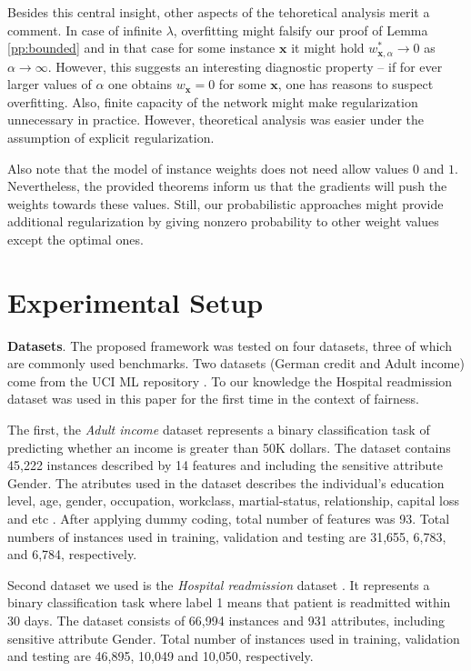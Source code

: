 \documentclass[preprint,12pt]{elsarticle}
\begin{document}
Besides this central insight, other aspects of the tehoretical analysis merit a comment. In case of infinite $\lambda$, overfitting might falsify our proof of Lemma \ref{pp:bounded} and in that case for some instance $\mathbf{x}$ it might hold $w^*_{\mathbf{x},\alpha}\rightarrow 0$ as $\alpha\rightarrow\infty$. However, this suggests an interesting diagnostic property -- if for ever larger values of $\alpha$ one obtains $w_\mathbf{x}=0$ for some $\mathbf{x}$, one has reasons to suspect overfitting. Also, finite capacity of the network might make regularization unnecessary in practice. However, theoretical analysis was easier under the assumption of explicit regularization.

Also note that the model of instance weights does not need allow values $0$ and $1$. Nevertheless, the provided theorems inform us that the gradients will push the weights towards these values. Still, our probabilistic approaches might provide additional regularization by giving nonzero probability to other weight values except the optimal ones.



\section{Experimental Setup}
\label{Sec:exp-evaluation}

\textbf{Datasets}. The proposed framework was tested on four datasets, three of which are commonly used benchmarks. Two datasets (German credit and Adult income) come from the UCI ML repository \cite{frank2011uci}. To our knowledge the Hospital readmission dataset was used in this paper for the first time in the context of fairness.

The first, the \textit{Adult income} dataset \cite{kohavi1996scaling} represents a binary classification task of predicting whether an income is greater than 50K dollars. The dataset contains 45,222 instances described by 14 features and including the sensitive attribute Gender. The atributes used in the dataset describes the individual's education level, age, gender, occupation, workclass, martial-status, relationship, capital loss and etc \cite{Dua:2019}. After applying dummy coding, total number of features was 93. Total numbers of instances used in training, validation and testing are 31,655, 6,783, and 6,784, respectively.

Second dataset we used is the \textit{Hospital readmission} dataset \cite{stiglic2015comprehensible}. It represents a binary classification task where label 1 means that patient is readmitted within 30 days. The dataset consists of 66,994 instances and 931 attributes, including sensitive attribute Gender. Total number of instances used in training, validation and testing are 46,895, 10,049 and 10,050, respectively.
\end{document}
